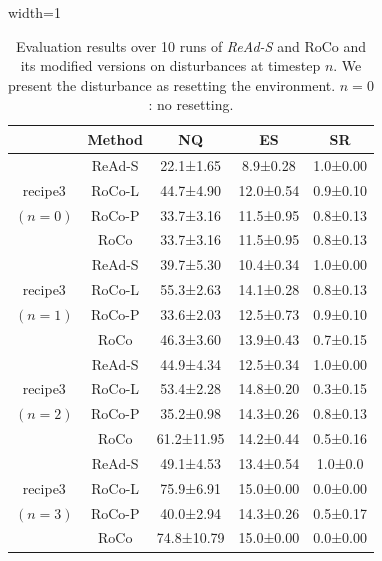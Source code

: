 \documentclass[11pt]{article}
\theoremstyle{plain}
\theoremstyle{remark}
\begin{document}
\begin{table}[t]
\centering
\caption{Evaluation results over 10 runs of \emph{ReAd-S} and RoCo and its modified versions on disturbances at timestep $n$. We present the disturbance as resetting the environment. $n = 0$: no resetting.}
\vspace{-0.8em}
\begin{adjustbox}{width=1\columnwidth}
\begin{tabular}{ccccc}
\toprule
\multicolumn{1}{l}{}       & Method       & NQ        &  ES      & SR   \\ \midrule
                           & ReAd-S       & 22.1±1.65    & 8.9±0.28  & 1.0±0.00 
\\ 
recipe3                    & RoCo-L       & 44.7±4.90    & 12.0±0.54 & 0.9±0.10 \\
 $(n = 0)$                 & RoCo-P       & 33.7±3.16    & 11.5±0.95 & 0.8±0.13 \\
                           & RoCo         & 33.7±3.16    & 11.5±0.95 & 0.8±0.13 
\\ \midrule
                           & ReAd-S       & 39.7±5.30   & 10.4±0.34  & 1.0±0.00 
\\ 
recipe3                    & RoCo-L       & 55.3±2.63   & 14.1±0.28  & 0.8±0.13 \\
$(n = 1)$                  & RoCo-P       & 33.6±2.03   & 12.5±0.73  & 0.9±0.10
\\
                           & RoCo         & 46.3±3.60   & 13.9±0.43 & 0.7±0.15 
\\ \midrule
                           & ReAd-S       & 44.9±4.34   & 12.5±0.34 & 1.0±0.00 
\\ 
recipe3                    & RoCo-L       & 53.4±2.28   & 14.8±0.20 & 0.3±0.15  
\\
$(n = 2)$                  & RoCo-P       & 35.2±0.98   & 14.3±0.26 & 0.8±0.13
\\
                           & RoCo         & 61.2±11.95 & 14.2±0.44 & 0.5±0.16   
\\ \midrule
                           & ReAd-S       & 49.1±4.53  & 13.4±0.54  & 1.0±0.0 
\\ 
recipe3                    & RoCo-L       & 75.9±6.91  & 15.0±0.00  & 0.0±0.00  \\
$(n = 3)$                  & RoCo-P       & 40.0±2.94    & 14.3±0.26  & 0.5±0.17
\\
                           & RoCo         & 74.8±10.79  & 15.0±0.00 & 0.0±0.00 \\ \bottomrule
\end{tabular}
\end{adjustbox}
\label{disruption_results}
\vspace{-1.5em}
\end{table}
\end{document}

